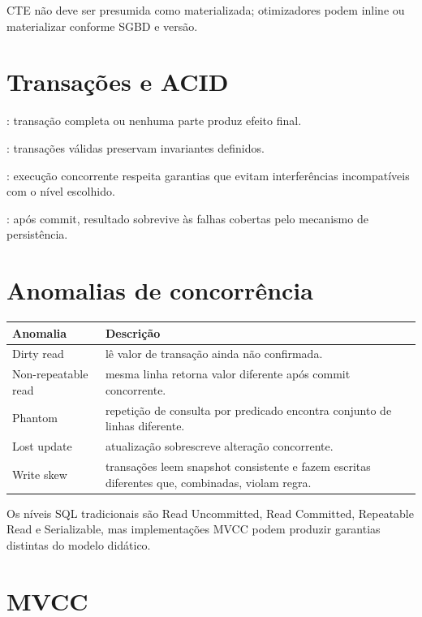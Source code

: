 CTE não deve ser presumida como materializada; otimizadores podem inline ou materializar conforme SGBD e versão.

\section{Transações e ACID}

: transação completa ou nenhuma parte produz efeito final.

: transações válidas preservam invariantes definidos.

: execução concorrente respeita garantias que evitam interferências incompatíveis com o nível escolhido.

: após commit, resultado sobrevive às falhas cobertas pelo mecanismo de persistência.

\section{Anomalias de concorrência}

\begin{table}[ht]
\centering
\small
\begin{tabularx}{\textwidth}{l X}
\toprule
Anomalia & Descrição \\
\midrule
Dirty read & lê valor de transação ainda não confirmada. \\
Non-repeatable read & mesma linha retorna valor diferente após commit concorrente. \\
Phantom & repetição de consulta por predicado encontra conjunto de linhas diferente. \\
Lost update & atualização sobrescreve alteração concorrente. \\
Write skew & transações leem snapshot consistente e fazem escritas diferentes que, combinadas, violam regra. \\
\bottomrule
\end{tabularx}
\end{table}

Os níveis SQL tradicionais são Read Uncommitted, Read Committed, Repeatable Read e Serializable, mas implementações MVCC podem produzir garantias distintas do modelo didático.

\section{MVCC}

